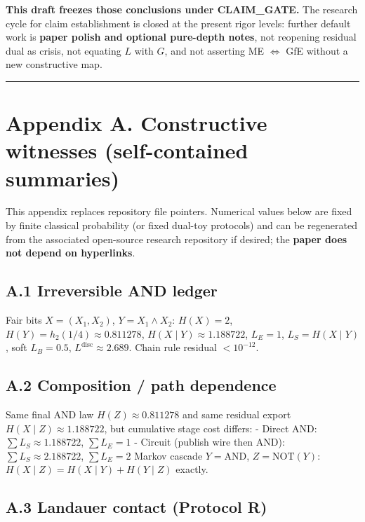 \documentclass[
  11pt,
]{article}
\begin{document}
\textbf{This draft freezes those conclusions under CLAIM\_GATE.} The research cycle for claim establishment is closed at the present rigor levels: further default work is \textbf{paper polish and optional pure-depth notes}, not reopening residual dual as crisis, not equating \(L\) with \(G\), and not asserting ME \(\Leftrightarrow\) GfE without a new constructive map.

\begin{center}\rule{0.5\linewidth}{0.5pt}\end{center}

\section{Appendix A. Constructive witnesses (self-contained summaries)}\label{appendix-a.-constructive-witnesses-self-contained-summaries}

This appendix replaces repository file pointers. Numerical values below are fixed by finite classical probability (or fixed dual-toy protocols) and can be regenerated from the associated open-source research repository if desired; the \textbf{paper does not depend on hyperlinks}.

\subsection{A.1 Irreversible AND ledger}\label{a.1-irreversible-and-ledger}

Fair bits \(X=(X_1,X_2)\), \(Y=X_1\land X_2\): \(H(X)=2\), \(H(Y)=h_2(1/4)\approx 0.811278\), \(H(X\mid Y)\approx 1.188722\), \(L_E=1\), \(L_S=H(X\mid Y)\), soft \(L_B=0.5\), \(L^{\mathrm{disc}}\approx 2.689\). Chain rule residual \(<10^{-12}\).

\subsection{A.2 Composition / path dependence}\label{a.2-composition-path-dependence}

Same final AND law \(H(Z)\approx 0.811278\) and same residual export \(H(X\mid Z)\approx 1.188722\), but cumulative stage cost differs: - Direct AND: \(\sum L_S \approx 1.188722\), \(\sum L_E=1\) - Circuit (publish wire then AND): \(\sum L_S \approx 2.188722\), \(\sum L_E=2\) Markov cascade \(Y=\mathrm{AND}\), \(Z=\mathrm{NOT}(Y)\): \(H(X\mid Z)=H(X\mid Y)+H(Y\mid Z)\) exactly.

\subsection{A.3 Landauer contact (Protocol R)}\label{a.3-landauer-contact-protocol-r}
\end{document}
